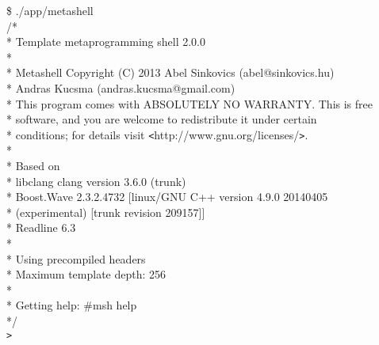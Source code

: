 
\begin{tttenv}
\noindent
{\color{color02} \$} ./app/metashell \\
{\color{color03}/* } \\
{\color{color03} * Template metaprogramming shell 2.0.0 } \\
{\color{color03} * } \\
{\color{color03} * Metashell Copyright (C) 2013 Abel Sinkovics (abel@sinkovics.hu)} \\
{\color{color03} * \hspace{14em}                Andras Kucsma  (andras.kucsma@gmail.com)} \\
{\color{color03} * This program comes with ABSOLUTELY NO WARRANTY. This is free}  \\
{\color{color03} * software, and you are welcome to redistribute it under certain} \\
{\color{color03} * conditions; for details visit \texttt{<}http://www.gnu.org/licenses/\texttt{>}. } \\
{\color{color03} * } \\
{\color{color03} * Based on } \\
{\color{color03} * \hspace{1em} libclang   clang version 3.6.0 (trunk) } \\
{\color{color03} * \hspace{1em} Boost.Wave 2.3.2.4732 [linux/GNU C++ version 4.9.0 20140405 } \\
{\color{color03} * \hspace{12em}        (experimental) [trunk revision 209157]] } \\
{\color{color03} * \hspace{1em} Readline   6.3 } \\
{\color{color03} * } \\
{\color{color03} * Using precompiled headers } \\
{\color{color03} * Maximum template depth: 256 } \\
{\color{color03} * } \\
{\color{color03} * Getting help: \#msh help } \\
{\color{color03} */} \\
\texttt{>}
\end{tttenv}

